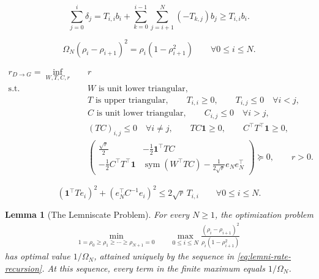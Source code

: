 \documentclass[10pt,a4paper]{amsart}
\newtheorem{lemma}{Lemma}
\begin{document}
\begin{equation}\label{eq:ogm-cut-r}
    \sum_{j=0}^i\delta_j
    =T_{i,i}b_i
    +\sum_{k=0}^{i-1}\sum_{j=i+1}^N(-T_{k,j})b_j
    \geq T_{i,i}b_i.
\end{equation}

\begin{equation}\label{eq:lemni-rate-recursion}
    \Omega_N(\rho_i-\rho_{i+1})^2
    =\rho_i(1-\rho_{i+1}^2)
    \qquad \forall 0\leq i\leq N.
\end{equation}

\begin{equation}\label{eq:lemni-TC-problem}
\begin{aligned}
 r_{D\rightarrow G}
 =\inf_{W,T,C,r}\quad &r\\
 \mathrm{s.t.}\quad
 &W\text{ is unit lower triangular},\\
 &T\text{ is upper triangular},\qquad T_{i,i}\geq0,\qquad T_{i,j}\leq0 \quad\forall i<j,\\
 &C\text{ is unit lower triangular},\qquad C_{i,j}\leq0\quad \forall i>j,\\
 &(TC)_{i,j}\leq0\quad \forall i\neq j,\qquad TC\mathbf1\geq0,
 \qquad C^\top T^\top\mathbf1\geq0,\\
 &\begin{pmatrix}
       \frac{\sqrt r}{2} &-\frac12\mathbf1^\top TC\\[1mm]
       -\frac12C^\top T^\top\mathbf1
       &\operatorname{sym}(W^\top TC)-\frac1{2\sqrt r}e_Ne_N^\top
   \end{pmatrix}\succeq0,\qquad r>0.
\end{aligned}
\end{equation}

\begin{equation}\label{eq:lemni-diagonal-conditions}
    (\mathbf1^\top Te_i)^2+(e_N^\top C^{-1}e_i)^2
    \leq 2\sqrt r\,T_{i,i}
    \qquad \forall 0\leq i\leq N.
\end{equation}

\begin{lemma}[The Lemniscate Problem]\label{lem:lemni-scalar-prob}
For every $N\geq1$, the optimization problem
\begin{equation}\label{eq:lemni-scalar-prob}
\begin{aligned}
 \min_{1=\rho_0\geq\rho_1\geq\cdots\geq\rho_{N+1}=0}\quad
 &\max_{0\leq i\leq N}
 \frac{(\rho_i-\rho_{i+1})^2}
 {\rho_i(1-\rho_{i+1}^2)}
\end{aligned}
\end{equation}
has optimal value $1/\Omega_N$, attained uniquely by the sequence in
\eqref{eq:lemni-rate-recursion}. At this sequence, every term in the finite
maximum equals $1/\Omega_N$. 
\end{lemma}
\end{document}
